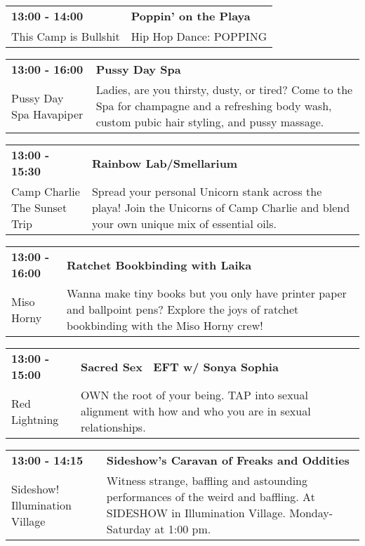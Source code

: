 \begin{tabular}{ p{1in} p{2.2in} }
    \textbf{13:00 - 14:00} & \textbf{Poppin' on the Playa} \\
    This Camp is Bullshit \newline  & Hip Hop Dance: POPPING \\
    \hline 
\end{tabular}
    
\begin{tabular}{ p{1in} p{2.2in} }
    \textbf{13:00 - 16:00} & \textbf{Pussy Day Spa} \\
    Pussy Day Spa \newline Havapiper & Ladies, are you thirsty, dusty, or tired? Come to the Spa for champagne and a refreshing body wash, custom pubic hair styling, and pussy massage. \\
    \hline 
\end{tabular}
    
\begin{tabular}{ p{1in} p{2.2in} }
    \textbf{13:00 - 15:30} & \textbf{Rainbow Lab/Smellarium} \\
    Camp Charlie \newline The Sunset Trip & Spread your personal Unicorn stank across the playa! Join the Unicorns of Camp Charlie and blend your own unique mix of essential oils. \\
    \hline 
\end{tabular}
    
\begin{tabular}{ p{1in} p{2.2in} }
    \textbf{13:00 - 16:00} & \textbf{Ratchet Bookbinding with Laika } \\
    Miso Horny \newline  & Wanna make tiny books but you only have printer paper and ballpoint pens? Explore the joys of ratchet bookbinding with the Miso Horny crew! \\
    \hline 
\end{tabular}
    
\begin{tabular}{ p{1in} p{2.2in} }
    \textbf{13:00 - 15:00} & \textbf{Sacred Sex~ EFT w/ Sonya Sophia} \\
    Red Lightning \newline  & OWN the root of your being. TAP into sexual alignment with how and who you are in sexual relationships. \\
    \hline 
\end{tabular}
    
\begin{tabular}{ p{1in} p{2.2in} }
    \textbf{13:00 - 14:15} & \textbf{Sideshow's Caravan of Freaks and Oddities} \\
    Sideshow! \newline Illumination Village & Witness strange, baffling and astounding performances of the weird and baffling. At SIDESHOW in Illumination Village. Monday-Saturday at 1:00 pm. \\
    \hline 
\end{tabular}
    
